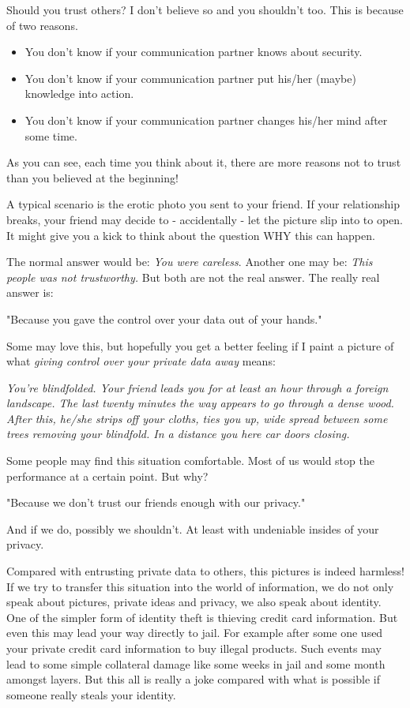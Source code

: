 \documentclass[twoside,a4paper,english,12pt,authoryear,openright]{book}
\begin{document}
Should you trust others? I don't believe so and you shouldn't too. This is because of two reasons.

\begin{itemize}
  \item {You don't know if your communication partner knows about security.}
  \item {You don't know if your communication partner put his/her (maybe) knowledge into action.}
  \item {You don't know if your communication partner changes his/her mind after some time.}
\end{itemize}

As you can see, each time you think about it, there are more reasons not to trust than you believed at the beginning!

A typical scenario is the erotic photo you sent to your friend. If your relationship breaks, your friend may decide to - accidentally - let the picture slip into to open. It might give you a kick to think about the question WHY this can happen.

The normal answer would be: \textit{You were careless}. Another one may be: \textit{This people was not trustworthy.} But both are not the real answer. The really real answer is:

"Because you gave the control over your data out of your hands."

Some may love this, but hopefully you get a better feeling if I paint a picture of what \textit{giving control over your private data away} means:

\textit{You're blindfolded. Your friend leads you for at least an hour through a foreign landscape. The last twenty minutes the way appears to go through a dense wood. After this, he/she strips off your cloths, ties you up, wide spread between some trees removing your blindfold. In a distance you here car doors closing.}

Some people may find this situation comfortable. Most of us would stop the performance at a certain point. But why?

"Because we don't trust our friends enough with our privacy."

And if we do, possibly we shouldn't. At least with undeniable insides of your privacy.

Compared with entrusting private data to others, this pictures is indeed harmless! If we try to transfer this situation into the world of information, we do not only speak about pictures, private ideas and privacy, we also speak about identity. One of the simpler form of identity theft is thieving credit card information. But even this may lead your way directly to jail. For example after some one used your private credit card information to buy illegal products. Such events may lead to some simple collateral damage like some weeks in jail and some month amongst layers. But this all is really a joke compared with what is possible if someone really steals your identity.
\end{document}
